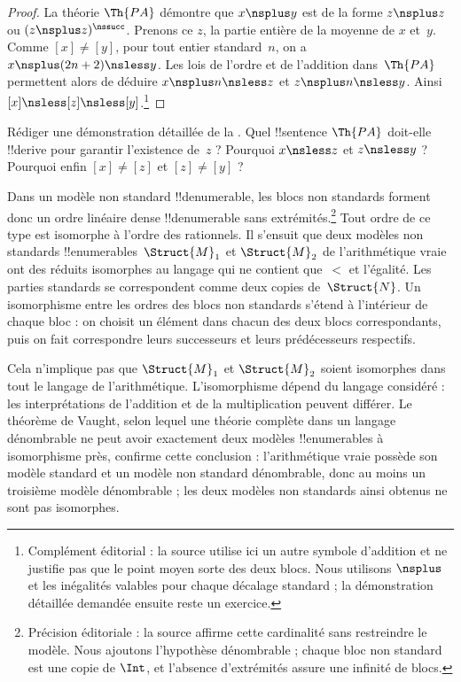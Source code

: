 \documentclass[../../../include/open-logic-section]{subfiles}
\begin{document}
\begin{proof}
La théorie $\Th{PA}$ démontre que
$x\nsplus y$ est de la forme
$z\nsplus z$ ou
$(z\nsplus z)^\nssucc$.
Prenons ce $z$, la partie entière
de la moyenne de $x$ et~$y$.
Comme $[x]\neq[y]$, pour tout entier
standard~$n$, on a
$x\nsplus(2n+2)\nsless y$.
Les lois de l'ordre et de l'addition
dans~$\Th{PA}$ permettent alors
de déduire
$x\nsplus n\nsless z$ et
$z\nsplus n\nsless y$.
Ainsi $[x]\nsless[z]\nsless[y]$.\footnote{Complément éditorial : la source utilise ici un autre symbole d'addition et ne justifie pas que le point moyen sorte des deux blocs. Nous utilisons $\nsplus$ et les inégalités valables pour chaque décalage standard ; la démonstration détaillée demandée ensuite reste un exercice.}
\end{proof}

\begin{prob}
Rédiger une démonstration détaillée de la
.
Quel !!{sentence} $\Th{PA}$ doit-elle
!!{derive} pour garantir l'existence
de~$z$ ? Pourquoi $x\nsless z$
et $z\nsless y$ ? Pourquoi enfin
$[x]\neq[z]$ et $[z]\neq[y]$ ?
\end{prob}

\begin{explain}
Dans un modèle non standard
!!{denumerable}, les blocs non standards
forment donc un ordre linéaire dense
!!{denumerable} sans extrémités.\footnote{Précision éditoriale : la source affirme cette cardinalité sans restreindre le modèle. Nous ajoutons l'hypothèse dénombrable ; chaque bloc non standard est une copie de $\Int$, et l'absence d'extrémités assure une infinité de blocs.}
Tout ordre de ce type est isomorphe
à l'ordre des rationnels. Il s'ensuit
que deux modèles non standards
!!{enumerable}s~$\Struct{M}_1$ et
$\Struct{M}_2$ de l'arithmétique vraie
ont des réduits isomorphes au langage
qui ne contient que~$<$ et l'égalité.
Les parties standards se correspondent
comme deux copies de~$\Struct{N}$.
Un isomorphisme entre les ordres
des blocs non standards s'étend
à l'intérieur de chaque bloc :
on choisit un élément dans chacun
des deux blocs correspondants, puis
on fait correspondre leurs successeurs
et leurs prédécesseurs respectifs.

Cela n'implique pas que
$\Struct{M}_1$ et $\Struct{M}_2$
soient isomorphes dans tout le langage
de l'arithmétique. L'isomorphisme
dépend du langage considéré : les
interprétations de l'addition et de la
multiplication peuvent différer.
Le théorème de Vaught, selon lequel
une théorie complète dans un langage dénombrable ne peut avoir
exactement deux modèles !!{enumerable}s
à isomorphisme près, confirme cette conclusion : l'arithmétique vraie possède
son modèle standard et un modèle non standard dénombrable, donc au moins un troisième
modèle dénombrable ; les deux modèles non standards ainsi obtenus ne sont pas isomorphes.
\end{explain}
\end{document}
